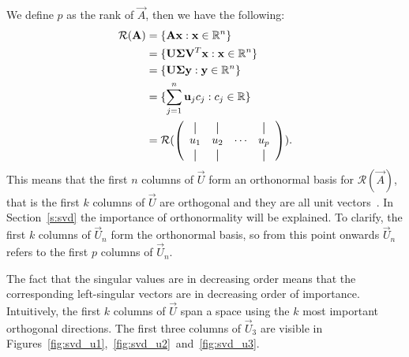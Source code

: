 We define \(p\) as the rank of \(\vec{A}\), then we have the following:
\begin{align*}
    \mathcal{R}(\vec{A}) & = \{\vec{A}\vec{x}:\vec{x}\in\mathbb{R}^n\}                      \\
                         & = \{\vec{U}\vec{\Sigma}\vec{V}^T\vec{x}:\vec{x}\in\mathbb{R}^n\} \\
                         & = \{\vec{U}\vec{\Sigma}\vec{y}:\vec{y}\in\mathbb{R}^n\}          \\
                         & = \{\sum_{j = 1}^n \vec{u}_j c_j:c_j\in\mathbb{R}\}            \\
                         & = \mathcal{R}(\left(\begin{array}{cccc}
            \vertbar & \vertbar &        & \vertbar \\
            u_1      & u_2      & \cdots & u_p      \\
            \vertbar & \vertbar &        & \vertbar \\
        \end{array}\right)).
\end{align*}
This means that the first \(n\) columns of \(\vec{U}\) form an orthonormal basis for \(\mathcal{R}(\vec{A})\), that is the first \(k\) columns of \(\vec{U}\) are orthogonal and they are all unit vectors~\cite{Cao2006}.
In Section~\ref{s:svd} the importance of orthonormality will be explained.
To clarify, the first \(k\) columns of \(\vec{U}_n\) form the orthonormal basis, so from this point onwards \(\vec{U}_n\) refers to the first \(p\) columns of \(\vec{U}_n\).

The fact that the singular values are in decreasing order means that the corresponding left-singular vectors are in decreasing order of importance.
Intuitively, the first \(k\) columns of \(\vec{U}\) span a space using the \(k\) most important orthogonal directions.
The first three columns of \(\vec{U}_3\) are visible in Figures~\ref{fig:svd_u1},~\ref{fig:svd_u2}~and~\ref{fig:svd_u3}.

